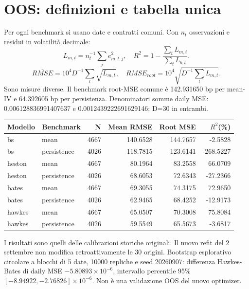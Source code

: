 \documentclass[10pt,a4paper]{article}
\begin{document}
\section{OOS: definizioni e tabella unica}
Per ogni benchmark si usano date e contratti comuni. Con $n_t$ osservazioni e residui in volatilità decimale:
\[L_{m,t}=n_t^{-1}\sum_j e_{m,t,j}^2,\quad R^2=1-\frac{\sum_t L_{m,t}}{\sum_t L_{b,t}}.\]
\[\overline{RMSE}=10^4D^{-1}\sum_t\sqrt{L_{m,t}},\quad RMSE_{root}=10^4\sqrt{D^{-1}\sum_tL_{m,t}}.\]
Sono misure diverse. Il benchmark root-MSE comune è 142.931650 bp per mean-IV e 64.392605 bp per persistenza. Denominatori somme daily MSE: 0.006128836991407637 e 0.0012439222691629146; D=30 in entrambi.
\begin{center}\small\begin{tabular}{llrrrr}\toprule
Modello & Benchmark & N & Mean RMSE & Root MSE & $R^2$(\%)\\\midrule
bs & mean & 4667 & 140.6528 & 144.7657 & -2.5828 \\
bs & persistence & 4026 & 118.7815 & 123.6141 & -268.5227 \\
heston & mean & 4667 & 80.1964 & 83.2558 & 66.0709 \\
heston & persistence & 4026 & 68.6053 & 72.6343 & -27.2366 \\
bates & mean & 4667 & 69.3055 & 74.3175 & 72.9650 \\
bates & persistence & 4026 & 62.9465 & 68.4252 & -12.9173 \\
hawkes & mean & 4667 & 65.0507 & 70.3008 & 75.8084 \\
hawkes & persistence & 4026 & 59.5549 & 65.5673 & -3.6817 \\
\bottomrule\end{tabular}\end{center}
I risultati sono quelli delle calibrazioni storiche originali. Il nuovo refit del 2 settembre non modifica retroattivamente le 30 origini. Bootstrap esplorativo circolare a blocchi di 5 date, 10000 repliche e seed 20260907: differenza Hawkes-Bates di daily MSE $-5.80893\times10^{-6}$, intervallo percentile 95\% $[-8.94922,-2.76826]\times10^{-6}$. Non è una validazione OOS del nuovo optimizer.
\end{document}
